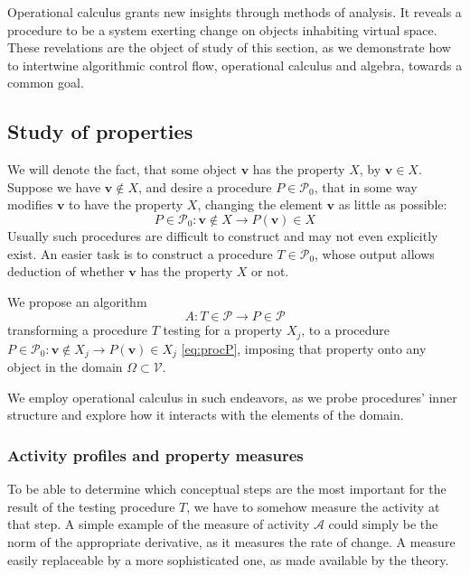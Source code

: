 \documentclass[smallcondensed]{svjour3}
\newcommand{\VV}{\mathcal{V}}
\newcommand{\vv}{\mathbf{v}}
\newcommand{\dP}{\mathcal{P}}
\begin{document}
   Operational calculus grants new insights through methods of analysis. It reveals a procedure to be a system exerting change on objects inhabiting virtual space. These revelations are the object of study of this section, as we demonstrate how to intertwine algorithmic control flow, operational calculus and algebra, towards a common goal.  
  
  \subsection{Study of properties}\label{sec:studyProperties}
  
  We will denote the fact, that some object $\vv$ has the property $X$, by $\vv\in
  X$. Suppose we have $\vv\notin X$, and desire a procedure $P\in\dP_0$, that in
  some way modifies $\vv$ to have the property $X$, changing the element $\vv$ as
  little as possible: 
  \begin{equation}\label{eq:procP}
  P\in \dP_0:\vv\notin X\to P(\vv)\in X
  \end{equation}
  Usually such procedures are difficult to construct and may not even explicitly
  exist. An easier task is to construct a procedure $T\in\dP_0$, whose output
  allows deduction of whether $\vv$ has the property $X$ or not. 
  
   We propose an algorithm
   \begin{equation}\label{eq:algA}
     A:T\in\dP\to P\in\dP
     \end{equation}
     transforming a procedure $T$ testing for a property $X_j$, to a procedure
     $P\in \dP_0:\vv\notin X_j\to P(\vv)\in X_j$ \eqref{eq:procP}, imposing that
     property onto any object in the domain $\Omega\subset \VV$.
   
   We employ operational calculus in such endeavors, as we probe
   procedures' inner structure and explore how it interacts with the elements of
   the domain.
 
\subsubsection{Activity profiles and property measures}\label{sec:propertyMeasure}
    
To be able to determine which conceptual steps are the most important for the
result of the testing procedure $T$, we have to somehow measure the activity
at that step. A simple example of the measure of activity $\mathcal{A}$ could simply be the norm of the
appropriate derivative, as it measures the rate of change. A measure easily replaceable by a more sophisticated one, as made available by the theory.
\end{document}
